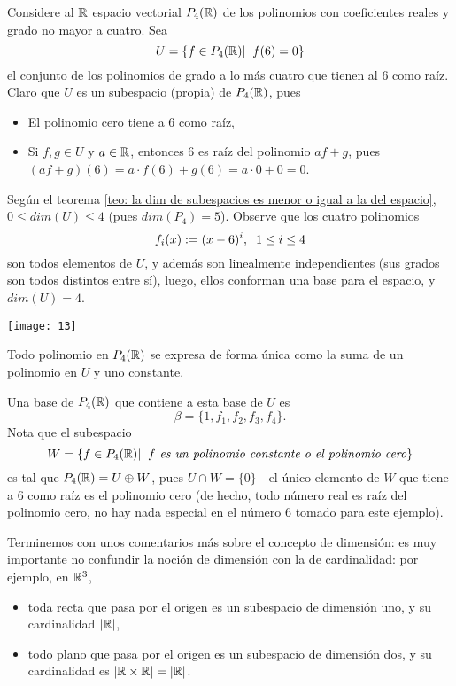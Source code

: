 \begin{ejem}
Considere al $\mathbb{R}$ espacio vectorial $P_{4}(\mathbb{R})$ de los polinomios
con coeficientes reales y grado no mayor a cuatro.
Sea
\[
U = \{ f \in P_{4}(\mathbb{R})  | \hspace{0.2cm} f(6) = 0 \}
\]
el conjunto de los polinomios de grado a lo más cuatro que tienen al
$6$ como raíz. Claro que $U$ es un subespacio
(propia) de $P_{4}(\mathbb{R})$,
pues
\begin{itemize}
	\item El polinomio cero tiene a $6$ como raíz,
	\item Si $f, g \in U$ y $a \in \mathbb{R}$, entonces $6$ es raíz del polinomio
	$af + g$, pues $(af+g)(6) = a \cdot f(6) + g(6) = a \cdot 0 + 0 = 0$.
\end{itemize}
Según el teorema \ref{teo: la dim de subespacios es menor o igual a la del espacio},
$0 \leq dim(U) \leq 4$ (pues $dim(P_{4}) = 5$).
Observe que los cuatro polinomios
\[
f_{i}(x) := (x-6)^{i}, \hspace{0.2cm}
1 \leq i \leq 4
\]
son todos elementos de $U$, y además son linealmente independientes
(sus grados son todos distintos entre sí), luego,
ellos conforman una base para el espacio, y $dim(U) = 4$.

\begin{marginfigure}
\texttt{[image: 13]} 
		\caption{Todo polinomio en $P_{4}(\mathbb{R})$ se
expresa de forma única como la suma de un polinomio en $U$ y 
uno constante.}
\end{marginfigure}

Una base de $P_{4}(\mathbb{R})$ que contiene a esta base de $U$ es
\[
\beta = \{ 1, f_{1}, f_{2}, f_{3}, f_{4} \}.
\]
Nota que el subespacio
\[
W = \{ f \in P_{4}(\mathbb{R})  | \hspace{0.2cm} f \textit{ es un
polinomio constante o el polinomio cero} \}
\]
es tal que $P_{4}(\mathbb{R}) = U \oplus W$, pues
$U \cap W = \{ 0 \}$ - el único elemento de $W$ que tiene
a $6$ como raíz es el polinomio cero (de hecho, todo número
real es raíz del polinomio cero, no hay nada especial en el número
$6$ tomado para este ejemplo).
\end{ejem}

Terminemos con unos comentarios más sobre el concepto de dimensión:
es muy importante no confundir la noción de dimensión con
la de cardinalidad: por ejemplo, en $\mathbb{R}^{3}$, 
\begin{itemize}
	\item toda recta que pasa por el origen es un subespacio
	de dimensión uno, y su cardinalidad $|\mathbb{R}|$, 
	\item todo plano que pasa por el origen es un subespacio
	de dimensión dos, y su cardinalidad es $|\mathbb{R} \times \mathbb{R}| = |\mathbb{R}|$.
\end{itemize}


